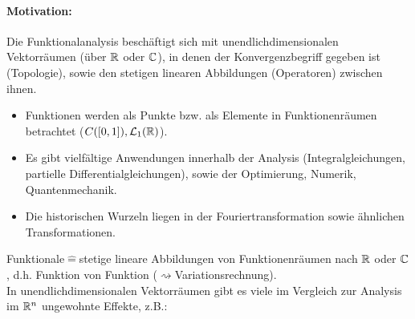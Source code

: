\paragraph{Motivation:}
Die Funktionalanalysis besch\"aftigt sich mit unendlichdimensionalen Vektorr\"aumen (\"uber $ \mathbb{R} $ oder $ \mathbb{C} $), in denen der Konvergenzbegriff gegeben ist (Topologie), sowie den stetigen linearen Abbildungen (Operatoren) zwischen ihnen.
\begin{itemize}
\item Funktionen werden als Punkte bzw. als Elemente in Funktionenr\"aumen betrachtet ($ C([0,1]),\mathcal L_1(\mathbb{R}) $).
\item Es gibt vielf\"altige Anwendungen innerhalb der Analysis (Integralgleichungen, partielle Differentialgleichungen), sowie der Optimierung, Numerik, Quantenmechanik.
\item Die historischen Wurzeln liegen in der Fouriertransformation sowie \"ahnlichen Transformationen.
\end{itemize}
Funktionale$ \hat{=} $stetige lineare Abbildungen von Funktionenr\"aumen nach $ \mathbb{R} $ oder $ \mathbb{C} $, d.h. Funktion von Funktion ($ \rightsquigarrow $Variationsrechnung).\\
In unendlichdimensionalen Vektorr\"aumen gibt es viele im Vergleich zur Analysis im $ \mathbb{R}^n $ ungewohnte Effekte, z.B.:
